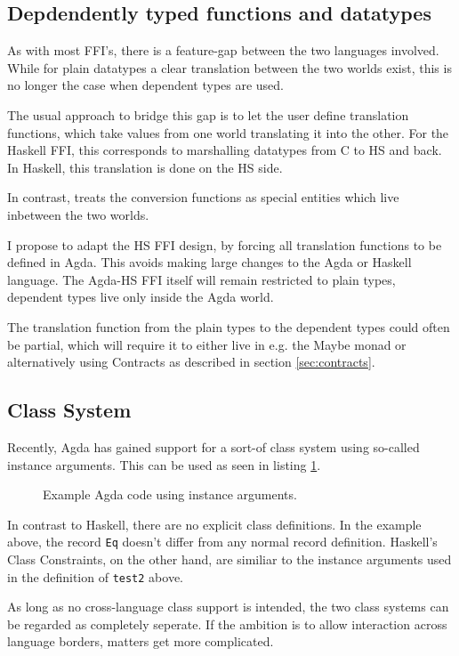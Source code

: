 \documentclass[12pt, a4paper, twoside]{report}
\begin{document}
\subsection{Depdendently typed functions and datatypes}
As with most FFI's, there is a feature-gap between the two languages involved. While for plain datatypes a clear
translation between the two worlds exist, this is no longer the case when dependent types are used.

The usual approach to bridge this gap is to let the user define translation functions, which take
values from one world translating it into the other. For the Haskell FFI, this corresponds to marshalling
datatypes from C to HS and back. In Haskell, this translation is done on the HS side.

In contrast, \cite{Osera:2012:DI:2103776.2103779} treats the conversion functions as special entities
which live inbetween the two worlds.


I propose to adapt the HS FFI design, by forcing all translation functions to be defined in Agda.
This avoids making large changes to the Agda or Haskell language. The Agda-HS FFI itself will remain
restricted to plain types, dependent types live only inside the Agda world.

The translation function from the plain types to the dependent types could often be partial,
which will require it to either live in e.g. the Maybe monad or alternatively using Contracts as described in section \ref{sec:contracts}.

\subsection{Class System}
Recently, Agda has gained support for a sort-of class system using so-called instance arguments. This can
be used as seen in listing \ref{lst:agda-inst-ex}.
\begin{figure}

\caption{Example Agda code using instance arguments.}
\label{lst:agda-inst-ex}
\end{figure}

In contrast to Haskell, there are no explicit class definitions. In the example above,
the record \texttt{Eq} doesn't differ from any normal record definition.
Haskell's Class Constraints, on the other hand, are similiar to the instance
arguments used in the definition of \texttt{test2} above.

As long as no cross-language class support is intended, the two class systems can be
regarded as completely seperate. If the ambition is to allow interaction across
language borders, matters get more complicated.
\end{document}
